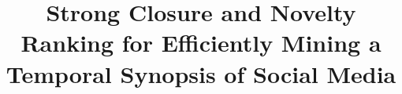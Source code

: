 \documentclass{sig-alternate}
\begin{document}
%

\title{Strong Closure and Novelty Ranking for Efficiently Mining a Temporal Synopsis of Social Media }
%
%
%
%
%
\maketitle
\end{document}
